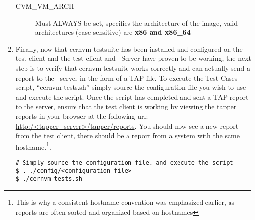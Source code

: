 \begin{enumerate}
\begin{description}
\item[CVM\_VM\_ARCH]		Must ALWAYS be set, specifies the architecture of the \cernvm image, valid architectures (case sensitive) are {\bf 
							x86 and x86\_64}
\end{description}	

\item	Finally, now that cernvm-testsuite has been installed and configured on the test client and the test client and \tapper~Server
			have proven to be working, the next step is to verify that cernvm-testsuite works correctly and can actually send a report to 	
			the \tapper~server in the form of a TAP file. To execute the \cernvm Test Cases script, ``cernvm-tests.sh'' simply source
			the configuration file you wish to use and execute the script. Once the script has completed and sent a TAP report to the server, 
			ensure that the test client is working by viewing the tapper reports in your browser at the  following 
			url: \url{http:/<tapper\_server>/tapper/reports}. You should now see a new report from the test client, there should be a 
			report from a system with the same hostname.\footnote{This is why a consistent hostname convention was emphasized earlier, as 
			reports are often sorted and organized based on hostnames}.

\lstset{language=bash,caption=Execute CernVM Test Cases Script}
\begin{lstlisting}
# Simply source the configuration file, and execute the script
$ . ./config/<configuration_file>
$ ./cernvm-tests.sh
\end{lstlisting}
\end{enumerate}